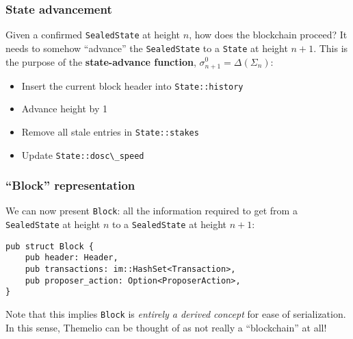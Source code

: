 \documentclass[
]{article}
\newcommand{\passthrough}[1]{#1}
\providecommand{\tightlist}{%
  \setlength{\itemsep}{0pt}\setlength{\parskip}{0pt}}
\begin{document}
\hypertarget{state-advancement}{%
  \subsubsection{State advancement}\label{state-advancement}}

Given a confirmed \passthrough{\lstinline!SealedState!} at height \(n\),
how does the blockchain proceed? It needs to somehow ``advance'' the
\passthrough{\lstinline!SealedState!} to a
\passthrough{\lstinline!State!} at height \(n+1\). This is the purpose
of the \textbf{state-advance function},
\(\sigma^0_{n+1}=\Delta(\Sigma_n)\):

\begin{itemize}
  \tightlist
  \item
        Insert the current block header into
        \passthrough{\lstinline!State::history!}
  \item
        Advance height by 1
  \item
        Remove all stale entries in \passthrough{\lstinline!State::stakes!}
  \item
        Update \passthrough{\lstinline!State::dosc\_speed!}
\end{itemize}

\hypertarget{block-representation}{%
  \subsubsection{``Block'' representation}\label{block-representation}}

We can now present \passthrough{\lstinline!Block!}: all the information
required to get from a \passthrough{\lstinline!SealedState!} at height
\(n\) to a \passthrough{\lstinline!SealedState!} at height \(n+1\):

\begin{lstlisting}
pub struct Block {
    pub header: Header,
    pub transactions: im::HashSet<Transaction>,
    pub proposer_action: Option<ProposerAction>,
}
\end{lstlisting}

Note that this implies \passthrough{\lstinline!Block!} is \emph{entirely
  a derived concept} for ease of serialization. In this sense, Themelio
can be thought of as not really a ``blockchain'' at all!
\end{document}
